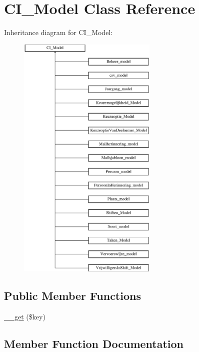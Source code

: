 \hypertarget{class_c_i___model}{}\section{C\+I\+\_\+\+Model Class Reference}
\label{class_c_i___model}
Inheritance diagram for C\+I\+\_\+\+Model\+:\begin{figure}[H]
\begin{center}
\leavevmode
\includegraphics[height=12.000000cm]{class_c_i___model}
\end{center}
\end{figure}
\subsection*{Public Member Functions}
\begin{DoxyCompactItemize}
\item 
\mbox{\hyperlink{class_c_i___model_a4537dad3b44254124991341cc91b28fb}{\+\_\+\+\_\+get}} (\$key)
\end{DoxyCompactItemize}


\subsection{Member Function Documentation}
\mbox{\label{class_c_i___model_a4537dad3b44254124991341cc91b28fb}} 
